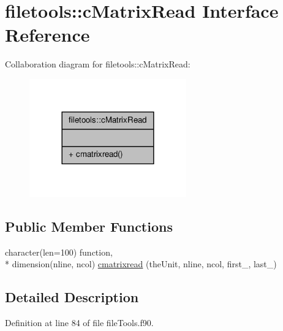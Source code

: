 \hypertarget{interfacefiletools_1_1c_matrix_read}{\section{filetools\-:\-:c\-Matrix\-Read Interface Reference}
\label{interfacefiletools_1_1c_matrix_read}
}


Collaboration diagram for filetools\-:\-:c\-Matrix\-Read\-:\nopagebreak
\begin{figure}[H]
\begin{center}
\leavevmode
\includegraphics[width=192pt]{interfacefiletools_1_1c_matrix_read__coll__graph}
\end{center}
\end{figure}
\subsection*{Public Member Functions}
\begin{DoxyCompactItemize}
\item 
character(len=100) function, \\*
dimension(nline, ncol) \hyperlink{interfacefiletools_1_1c_matrix_read_ad46208c86143112574df85f78b52bc95}{cmatrixread} (the\-Unit, nline, ncol, first\-\_\-, last\-\_\-)
\end{DoxyCompactItemize}


\subsection{Detailed Description}


Definition at line 84 of file file\-Tools.\-f90.



